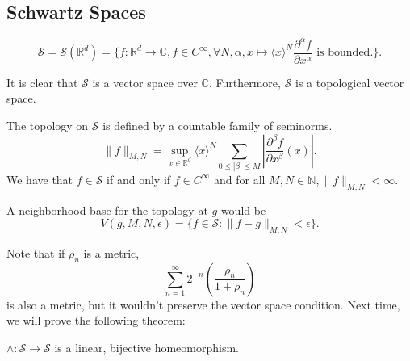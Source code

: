 \documentclass[11pt]{scrartcl}
\newcommand{\N}{\mathbb{N}}
\newcommand{\R}{\mathbb{R}}
\newcommand{\C}{\mathbb C}
\newcommand{\<}{\langle}
\renewcommand{\>}{\rangle}
\begin{document}
\subsection{Schwartz Spaces}
\begin{definition} $$\mathscr{S} = \mathscr{S}(\R^d) = \{f : \R^d \rightarrow \C, f \in C^{\infty}, \forall N, \alpha, x \mapsto \<x\>^N\frac{\partial^{\alpha}f}{\partial x^{\alpha}} \text{ is bounded.}\}.$$
\end{definition}
It is clear that $\mathscr{S}$ is a vector space over $\C$.  Furthermore, $\mathscr{S}$ is a topological vector space.  

The topology on $\mathscr{S}$ is defined by a countable family of seminorms.  
$$\|f\|_{M, N} = \sup_{x \in \R^d} \<x\>^N \sum_{0 \le |\beta| \le M} \left |\frac{\partial^\beta f}{\partial x^\beta}(x)\right |.$$
We have that $f \in \mathscr{S}$ if and only if $f \in C^{\infty}$ and for all $M, N \in \N, \|f\|_{M, N} < \infty$.

A neighborhood base for the topology at $g$ would be 
$$V(g, M, N, \epsilon) = \{f \in \mathscr{S} : \|f-g\|_{M, N} < \epsilon\}.$$

Note that if $\rho_n$ is a metric,
$$\sum_{n=1}^{\infty} 2^{-n}\left (\frac{\rho_n}{1+\rho_n}\right )$$ is also a metric, but it wouldn't preserve the vector space condition.  Next time, we will prove the following theorem:
\begin{thm} $\wedge:\mathscr{S} \rightarrow \mathscr{S}$ is a linear, bijective homeomorphism.
\end{thm}
\end{document}
